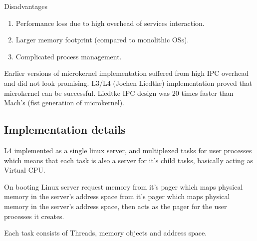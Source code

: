 \documentclass{article}
\begin{document}
        Disadvantages
        \begin{enumerate}[-, leftmargin = 0.7cm, nosep]
        \item Performance loss due to high overhead of services interaction.
        \item Larger memory footprint (compared to monolithic OSs).  
        \item Complicated process management.  
        \end{enumerate}

            Earlier versions of microkernel implementation suffered from high IPC overhead and
        did not look promising. L3/L4 (Jochen Liedtke) implementation proved that microkernel can be successful.
        Liedtke IPC design was 20 times faster than Mach's (fist generation of microkernel).


        \subsection{Implementation details}
        L4 implemented as a single linux server, and multiplexed tasks for user processes
        which means that each task is also a server for it's child tasks, basically acting as Virtual CPU.

        On booting Linux server request memory from it's pager which maps physical memory in
        the server's address space from it's pager which maps physical memory in the
        server's address space, then acts as the pager for the user processes it creates.

        Each task consists of Threads, memory objects and address space. 
        
\end{document}
